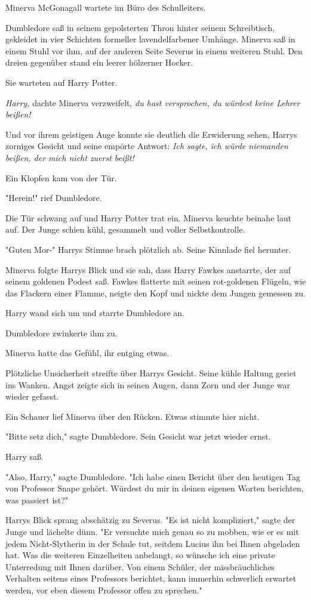 {\later

Minerva McGonagall wartete im Büro des Schulleiters.

Dumbledore saß in seinem gepolsterten Thron hinter seinem Schreibtisch, gekleidet in vier Schichten formeller lavendelfarbener Umhänge. Minerva saß in einem Stuhl vor ihm, auf der anderen Seite Severus in einem weiteren Stuhl. Den dreien gegenüber stand ein leerer hölzerner Hocker.

Sie warteten auf Harry Potter.

\emph{Harry,} dachte Minerva verzweifelt, \emph{du hast versprochen, du würdest keine Lehrer beißen!}

Und vor ihrem geistigen Auge konnte sie deutlich die Erwiderung sehen, Harrys zorniges Gesicht und seine empörte Antwort: \emph{Ich sagte, ich würde niemanden beißen, der mich nicht zuerst beißt!}

Ein Klopfen kam von der Tür.

"Herein!" rief Dumbledore.

Die Tür schwang auf und Harry Potter trat ein. Minerva keuchte beinahe laut auf. Der Junge schien kühl, gesammelt und voller Selbstkontrolle.

"Guten Mor-" Harrys Stimme brach plötzlich ab. Seine Kinnlade fiel herunter.

Minerva folgte Harrys Blick und sie sah, dass Harry Fawkes anstarrte, der auf seinem goldenen Podest saß. Fawkes flatterte mit seinen rot-goldenen Flügeln, wie das Flackern einer Flamme, neigte den Kopf und nickte dem Jungen gemessen zu.

Harry wand sich um und starrte Dumbledore an.

Dumbledore zwinkerte ihm zu.

Minerva hatte das Gefühl, ihr entging etwas.

Plötzliche Unsicherheit streifte über Harrys Gesicht. Seine kühle Haltung geriet ins Wanken. Angst zeigte sich in seinen Augen, dann Zorn und der Junge war wieder gefasst.

Ein Schauer lief Minerva über den Rücken. Etwas stimmte hier nicht.

"Bitte setz dich," sagte Dumbledore. Sein Gesicht war jetzt wieder ernst.

Harry saß.

"Also, Harry," sagte Dumbledore. "Ich habe einen Bericht über den heutigen Tag von Professor Snape gehört. Würdest du mir in deinen eigenen Worten berichten, was passiert ist?"

Harrys Blick sprang abschätzig zu Severus. "Es ist nicht kompliziert," sagte der Junge und lächelte dünn. "Er versuchte mich genau so zu mobben, wie er es mit jedem Nicht-Slytherin in der Schule tut, seitdem Lucius ihn bei Ihnen abgeladen hat. Was die weiteren Einzelheiten anbelangt, so wünsche ich eine private Unterredung mit Ihnen darüber. Von einem Schüler, der missbräuchliches Verhalten seitens eines Professors berichtet, kann immerhin schwerlich erwartet werden, vor eben diesem Professor offen zu sprechen."

}
